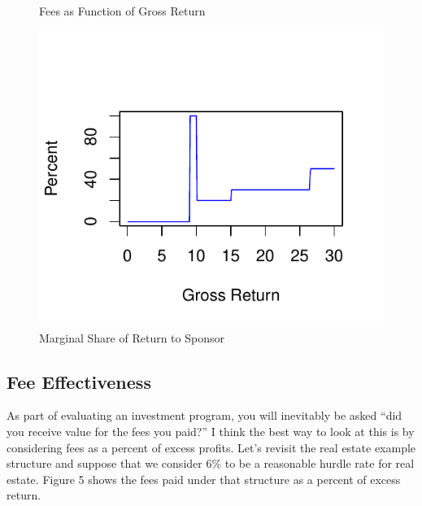 \documentclass[12pt,english]{article}\usepackage[]{graphicx}\usepackage[]{color}
\makeatletter
\def\maxwidth{ %
  \ifdim\Gin@nat@width>\linewidth
    \linewidth
  \else
    \Gin@nat@width
  \fi
}
\newenvironment{knitrout}{}{} %
\makeatother
\begin{document}
\begin{figure}[h]
\begin{minipage}[t]{0.45\columnwidth}
\caption{Fees as Function of Gross Return}
%
\end{minipage}\hfill{}%
\begin{minipage}[t]{0.45\columnwidth}%
\begin{knitrout}
\color{fgcolor}
\includegraphics[width=\maxwidth]{figure/pe10-1} 

\end{knitrout}

\caption{Marginal Share of Return to Sponsor}
%
\end{minipage}
\end{figure}


\subsection*{Fee Effectiveness}

As part of evaluating an investment program, you will inevitably be
asked ``did you receive value for the fees you paid?'' I think the
best way to look at this is by considering fees as a percent of excess
profits. Let's revisit the real estate example structure and suppose
that we consider 6\% to be a reasonable hurdle rate for real estate.
Figure 5 shows the fees paid under that structure as a percent of
excess return.
\end{document}
